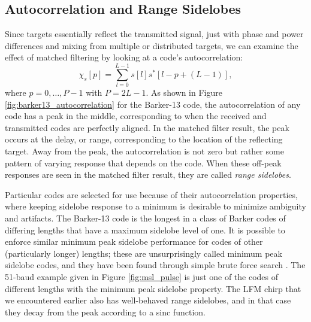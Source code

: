 \subsection{Autocorrelation and Range Sidelobes}
Since targets essentially reflect the transmitted signal, just with phase and power differences and mixing from multiple or distributed targets, we can examine the effect of matched filtering by looking at a code's autocorrelation:
\begin{equation}
 \chi_s[p] = \sum_{l=0}^{L-1} s[l] s^*[l - p + (L-1)],
\end{equation}
where $p=0,\ldots,P-1$ with $P=2L-1$. As shown in Figure \ref{fig:barker13_autocorrelation} for the Barker-13 code, the autocorrelation of any code has a peak in the middle, corresponding to when the received and transmitted codes are perfectly aligned. In the matched filter result, the peak occurs at the delay, or range, corresponding to the location of the reflecting target. Away from the peak, the autocorrelation is not zero but rather some pattern of varying response that depends on the code. When these off-peak responses are seen in the matched filter result, they are called \emph{range sidelobes}.

Particular codes are selected for use because of their autocorrelation properties, where keeping sidelobe response to a minimum is desirable to minimize ambiguity and artifacts. The Barker-13 code is the longest in a class of Barker codes of differing lengths that have a maximum sidelobe level of one. It is possible to enforce similar minimum peak sidelobe performance for codes of other (particularly longer) lengths; these are unsurprisingly called minimum peak sidelobe codes, and they have been found through simple brute force search \autocite{Lin75,CFB90,CHC01,CR05}. The 51-baud example given in Figure \ref{fig:msl_pulse} is just one of the codes of different lengths with the minimum peak sidelobe property. The LFM chirp that we encountered earlier also has well-behaved range sidelobes, and in that case they decay from the peak according to a sinc function.

